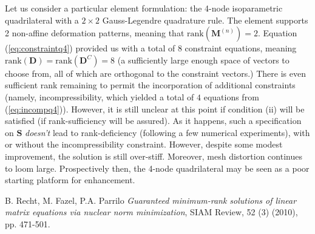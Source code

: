 \documentclass[12pt]{article}
\begin{document}
Let us consider a particular element formulation: the 4-node isoparametric quadrilateral with a $2 \times 2$ Gauss-Legendre quadrature rule. The element supports 2 non-affine deformation patterns, meaning that $\mbox{rank} (\mathbf{M}^{(n)}) = 2$. Equation (\ref{eq:constraintq4}) provided us with a total of 8 constraint equations, meaning $\mbox{rank} (\mathbf{D}) = \mbox{rank} (\mathbf{D}^C) = 8$ (a sufficiently large enough space of vectors to choose from, all of which are orthogonal to the constraint vectors.) There is even sufficient rank remaining to permit the incorporation of additional constraints (namely, incompressibility, which yielded a total of $4$ equations from (\ref{eq:incompq4})). However, it is still unclear at this point if condition (ii) will be satisfied (if rank-sufficiency will be assured). As it happens, such a specification on $\mathbf{S}$ \textit{doesn't} lead to rank-deficiency (following a few numerical experiments), with or without the incompressibility constraint. However, despite some modest improvement, the solution is still over-stiff. Moreover, mesh distortion continues to loom large. Prospectively then, the 4-node quadrilateral may be seen as a poor starting platform for enhancement.

\begin{thebibliography}{9}

  B. Recht, M. Fazel, P.A. Parrilo
  \emph{Guaranteed minimum-rank solutions of linear matrix equations via nuclear norm minimization},
  SIAM Review,
  52 (3) (2010),
  pp. 471-501.

\end{thebibliography}
\end{document}
